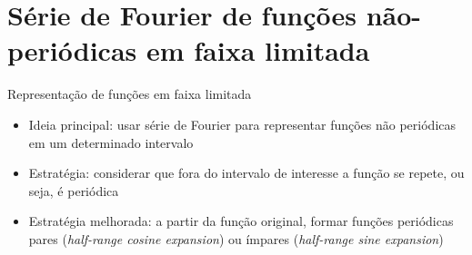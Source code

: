       \section[ slide = true]{Série de Fourier de funções não-periódicas em faixa limitada}
      \begin{slide}{Representação de funções em faixa limitada}
	      \begin{itemize}
		      \item Ideia principal: usar série de Fourier para representar funções não periódicas em um determinado intervalo
		      \item Estratégia: considerar que fora do intervalo de interesse a função se repete, ou seja, é periódica
		      \item Estratégia melhorada: a partir da função original, formar funções periódicas pares (\emph{half-range cosine expansion}) ou ímpares (\emph{half-range sine expansion})
	      \end{itemize}
      \end{slide}
      
